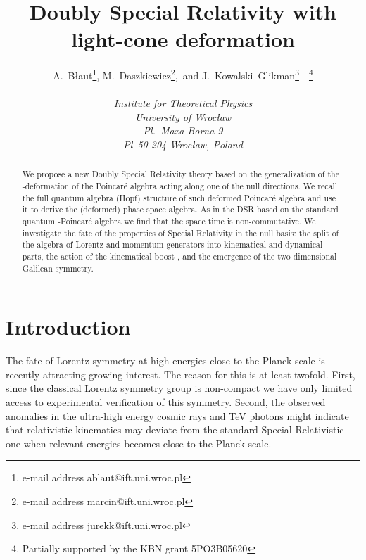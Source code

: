 \documentclass [12pt]  {article}
\begin{document}
\title{%
Doubly Special Relativity with light-cone deformation}
\author{A.\ B\l{}aut\thanks{e-mail address ablaut@ift.uni.wroc.pl},
M.\ Daszkiewicz\thanks{e-mail address marcin@ift.uni.wroc.pl},\,
and J.\ Kowalski--Glikman\thanks{e-mail address
jurekk@ift.uni.wroc.pl}~~\thanks{Partially supported by the   KBN
grant 5PO3B05620}\\  \\ {\em Institute for Theoretical
Physics}\\ {\em University of Wroc\l{}aw}\\ {\em Pl.\ Maxa Borna 9}\\
{\em Pl--50-204 Wroc\l{}aw, Poland}} \maketitle
\begin{abstract}
We propose a new Doubly Special Relativity theory based on the
generalization of the \myHighlight{$\kappa$}\coordHE{}-deformation of the Poincar\'e
algebra acting along one of the null directions. We recall the
full quantum algebra (Hopf) structure of such deformed Poincar\'e
algebra and use it to derive the  (deformed) phase space algebra.
As in the DSR based on the standard quantum \myHighlight{$\kappa$}\coordHE{}-Poincar\'e
algebra we find that the space time is non-commutative. We
investigate the fate of the properties of Special Relativity in
the null basis: the split of the algebra of Lorentz and momentum
generators into kinematical and dynamical parts, the action of the
kinematical boost \coordHE{}, and the emergence of the two
dimensional Galilean symmetry.
\end{abstract}
\clearpage

\section{Introduction}
 The fate of Lorentz symmetry at high energies close to the
Planck scale is recently attracting growing interest. The reason
for this is at least twofold. First, since the classical Lorentz
symmetry group is non-compact we have only limited access to
experimental verification of this symmetry. Second, the observed
anomalies in the ultra-high energy cosmic rays and TeV photons
\cite{astro} might indicate that relativistic kinematics may
deviate from the standard Special Relativistic one when relevant
energies becomes close to the Planck scale.
\end{document}
